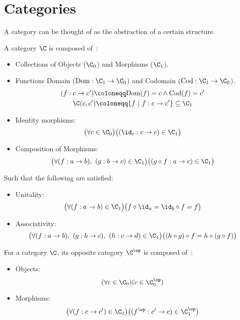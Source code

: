 \section{Categories}
A category can be thought of as the abstraction of a certain structure.

\begin{definition}
  A category $\C$ is composed of~\parencite[p.~4]{awodey:category_theory}:
  \begin{itemize}
    \item Collections of Objects ($\C_0$) and Morphisms ($\C_1$).
    \item Functions Domain ($\mathrm{Dom}:\C_1\to \C_0$) and Codomain
      ($\mathrm{Cod}: \C_1 \to \C_0$).
      \[
        \begin{gathered}
          (f : c\to c')
          \coloneqq \mathrm{Dom}(f) = c \land \mathrm{Cod}(f) = c'\\
          \C(c, c') \coloneqq \{f\ |\ f : c \to c'\}\subseteq \C_1
        \end{gathered}
      \]
    \item Identity morphisms:
      \[\big(\forall c \in \C_0\big)
        \big((\id_c : c\to c)\in \C_1\big)\]
    \item Composition of Morphisms:
      \[\big(\forall (f :a \to b),\ (g : b\to c) \in \C_1\big)
        \big((g\circ f :a\to c) \in \C_1\big)\]
  \end{itemize}

  Such that the following are satisfied:
  \begin{itemize}
    \item Unitality:
      \[\big(\forall (f:a\to b)\in \C_1\big)
        \big(f \circ \id_a = \id_b \circ f = f\big)\]
    \item Associativity:
      \[\big(\forall (f : a\to b),\ (g: b\to c),\ (h: c\to d)\in\C_1\big)
        \big((h \circ g) \circ f = h \circ (g \circ f)\big)\]
  \end{itemize}
\end{definition}

\begin{definition}
  For a category $\C$, its opposite category $\C^\op$ is composed
  of~\parencite[p.~15]{awodey:category_theory}:

  \begin{itemize}
    \item Objects:
      \[(\forall c \in \C_0)
        (c\in \C^\op_0)\]
    \item Morphisms:
      \[\big(\forall (f: c\to c') \in \C_1\big)
        \big((f^\op : c'\to c)\in \C^\op_1\big)\]
  \end{itemize}
\end{definition}

